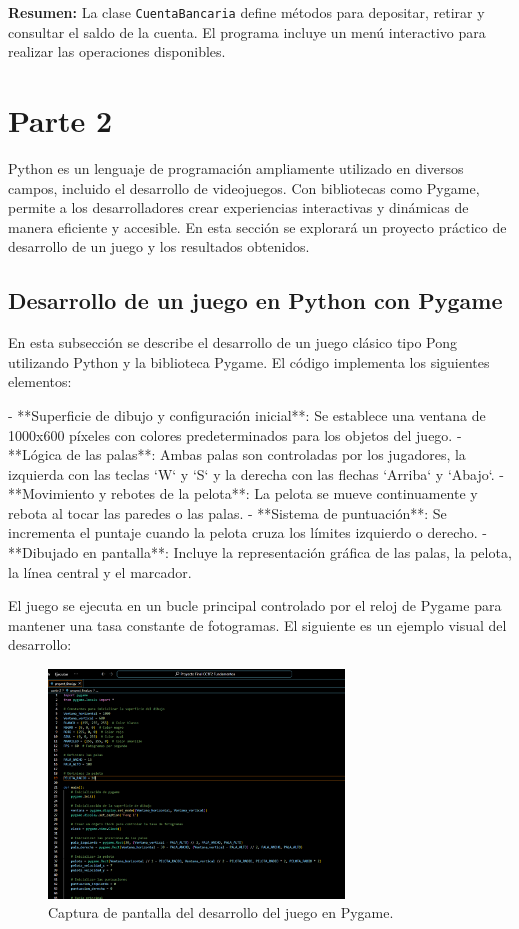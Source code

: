\documentclass{article}
\begin{document}
\noindent \textbf{Resumen:} La clase \texttt{CuentaBancaria} define métodos para depositar, retirar y consultar el saldo de la cuenta. El programa incluye un menú interactivo para realizar las operaciones disponibles.

\section*{Parte 2}
Python es un lenguaje de programación ampliamente utilizado en diversos campos, incluido el desarrollo de videojuegos. Con bibliotecas como Pygame, permite a los desarrolladores crear experiencias interactivas y dinámicas de manera eficiente y accesible. En esta sección se explorará un proyecto práctico de desarrollo de un juego y los resultados obtenidos.

\subsection{Desarrollo de un juego en Python con Pygame}
En esta subsección se describe el desarrollo de un juego clásico tipo Pong utilizando Python y la biblioteca Pygame. El código implementa los siguientes elementos:

- **Superficie de dibujo y configuración inicial**: Se establece una ventana de 1000x600 píxeles con colores predeterminados para los objetos del juego.
- **Lógica de las palas**: Ambas palas son controladas por los jugadores, la izquierda con las teclas `W` y `S` y la derecha con las flechas `Arriba` y `Abajo`.
- **Movimiento y rebotes de la pelota**: La pelota se mueve continuamente y rebota al tocar las paredes o las palas.
- **Sistema de puntuación**: Se incrementa el puntaje cuando la pelota cruza los límites izquierdo o derecho.
- **Dibujado en pantalla**: Incluye la representación gráfica de las palas, la pelota, la línea central y el marcador.

El juego se ejecuta en un bucle principal controlado por el reloj de Pygame para mantener una tasa constante de fotogramas. El siguiente es un ejemplo visual del desarrollo:

\begin{figure}[h!]
    \centering
    \includegraphics[width=0.7\textwidth]{pygame_desarrollo.png} %
    \caption{Captura de pantalla del desarrollo del juego en Pygame.}
    \label{fig:pygame_desarrollo}
\end{figure}
\end{document}
